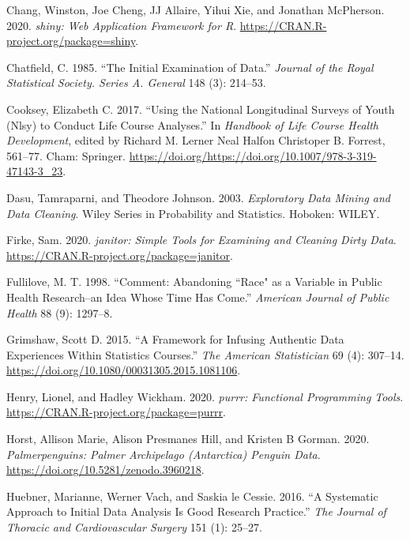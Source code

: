 \documentclass{article}
\begin{document}
\leavevmode\hypertarget{ref-shiny}{}%
Chang, Winston, Joe Cheng, JJ Allaire, Yihui Xie, and Jonathan McPherson. 2020. \emph{shiny: Web Application Framework for R}. \url{https://CRAN.R-project.org/package=shiny}.

\leavevmode\hypertarget{ref-Chatfield1985TIEo}{}%
Chatfield, C. 1985. ``The Initial Examination of Data.'' \emph{Journal of the Royal Statistical Society. Series A. General} 148 (3): 214--53.

\leavevmode\hypertarget{ref-eliznlsy}{}%
Cooksey, Elizabeth C. 2017. ``Using the National Longitudinal Surveys of Youth (Nlsy) to Conduct Life Course Analyses.'' In \emph{Handbook of Life Course Health Development}, edited by Richard M. Lerner Neal Halfon Christoper B. Forrest, 561--77. Cham: Springer. \url{https://doi.org/https://doi.org/10.1007/978-3-319-47143-3_23}.

\leavevmode\hypertarget{ref-DasuTamraparni2003Edma}{}%
Dasu, Tamraparni, and Theodore Johnson. 2003. \emph{Exploratory Data Mining and Data Cleaning}. Wiley Series in Probability and Statistics. Hoboken: WILEY.

\leavevmode\hypertarget{ref-janitor}{}%
Firke, Sam. 2020. \emph{janitor: Simple Tools for Examining and Cleaning Dirty Data}. \url{https://CRAN.R-project.org/package=janitor}.

\leavevmode\hypertarget{ref-racismnotrace}{}%
Fullilove, M. T. 1998. ``Comment: Abandoning ``Race" as a Variable in Public Health Research--an Idea Whose Time Has Come.'' \emph{American Journal of Public Health} 88 (9): 1297--8.

\leavevmode\hypertarget{ref-grimshaw}{}%
Grimshaw, Scott D. 2015. ``A Framework for Infusing Authentic Data Experiences Within Statistics Courses.'' \emph{The American Statistician} 69 (4): 307--14. \url{https://doi.org/10.1080/00031305.2015.1081106}.

\leavevmode\hypertarget{ref-purrr}{}%
Henry, Lionel, and Hadley Wickham. 2020. \emph{purrr: Functional Programming Tools}. \url{https://CRAN.R-project.org/package=purrr}.

\leavevmode\hypertarget{ref-penguins-data}{}%
Horst, Allison Marie, Alison Presmanes Hill, and Kristen B Gorman. 2020. \emph{Palmerpenguins: Palmer Archipelago (Antarctica) Penguin Data}. \url{https://doi.org/10.5281/zenodo.3960218}.

\leavevmode\hypertarget{ref-HuebnerMariannePhD2016Asat}{}%
Huebner, Marianne, Werner Vach, and Saskia le Cessie. 2016. ``A Systematic Approach to Initial Data Analysis Is Good Research Practice.'' \emph{The Journal of Thoracic and Cardiovascular Surgery} 151 (1): 25--27.
\end{document}
